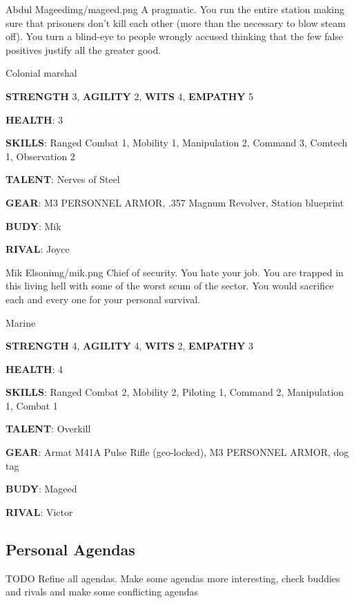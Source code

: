 \newsect

\medskip \medskip \medskip \medskip \medskip \medskip \medskip \medskip


\begin{rpg-pcbox}{Abdul Mageed}{img/mageed.png}
    A pragmatic. You run the entire station making sure that prisoners don't kill each other (more than the necessary to blow steam off). You turn a blind-eye to people wrongly accused thinking that the few false positives justify all the greater good.
\end{rpg-pcbox}

\begin{rpg-commentbox}{}
    Colonial marshal

    \textbf{STRENGTH} 3, \textbf{AGILITY} 2, \textbf{WITS} 4, \textbf{EMPATHY} 5

    \textbf{HEALTH}: 3

    \textbf{SKILLS}: Ranged Combat 1, Mobility 1, Manipulation 2, Command 3, Comtech 1, Observation 2
    
    \textbf{TALENT}: Nerves of Steel
    
    \textbf{GEAR}: M3 PERSONNEL ARMOR, .357 Magnum Revolver, Station blueprint
      
    \textbf{BUDY}: Mik
    
    \textbf{RIVAL}: Joyce
\end{rpg-commentbox}


\newsect

\begin{rpg-pcbox}{Mik Elson}{img/mik.png}
    Chief of security. You hate your job. You are trapped in this living hell with some of the worst scum of the sector. You would sacrifice each and every one for your personal survival.
\end{rpg-pcbox}

\begin{rpg-commentbox}{}
    Marine

    \textbf{STRENGTH} 4, \textbf{AGILITY} 4, \textbf{WITS} 2, \textbf{EMPATHY} 3

    \textbf{HEALTH}: 4

    \textbf{SKILLS}: Ranged Combat 2, Mobility 2, Piloting 1, Command 2, Manipulation 1, Combat 1
    
    \textbf{TALENT}: Overkill
    
    \textbf{GEAR}: Armat M41A Pulse Rifle (geo-locked), M3 PERSONNEL ARMOR, dog tag

    \textbf{BUDY}: Mageed
    
    \textbf{RIVAL}: Victor
\end{rpg-commentbox}

\newsect


\clearpage

\subsection{Personal Agendas}


\begin{rpg-warnbox}{TODO}
    Refine all agendas. Make some agendas more interesting, check buddies and rivals and make some conflicting agendas
\end{rpg-warnbox}

